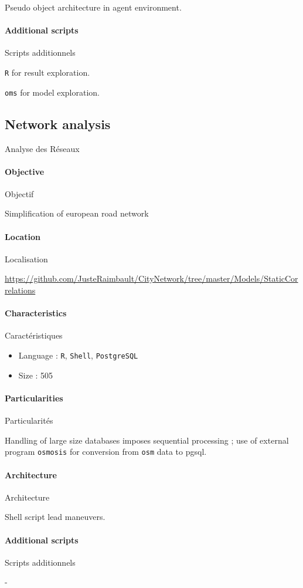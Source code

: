 Pseudo object architecture in agent environment.

\paragraph{Additional scripts}{Scripts additionnels}

\texttt{R} for result exploration.

\texttt{oms} for model exploration.






\subsection{Network analysis}{Analyse des Réseaux}

\paragraph{Objective}{Objectif}

Simplification of european road network

\paragraph{Location}{Localisation}

\url{https://github.com/JusteRaimbault/CityNetwork/tree/master/Models/StaticCorrelations}

\paragraph{Characteristics}{Caractéristiques}

\begin{itemize}
\item Language : \texttt{R}, \texttt{Shell}, \texttt{PostgreSQL}
\item Size : 505
\end{itemize}


\paragraph{Particularities}{Particularités}

Handling of large size databases imposes sequential processing ; use of external program \texttt{osmosis} for conversion from \texttt{osm} data to pgsql.

\paragraph{Architecture}{Architecture}

Shell script lead maneuvers.

\paragraph{Additional scripts}{Scripts additionnels}

-



